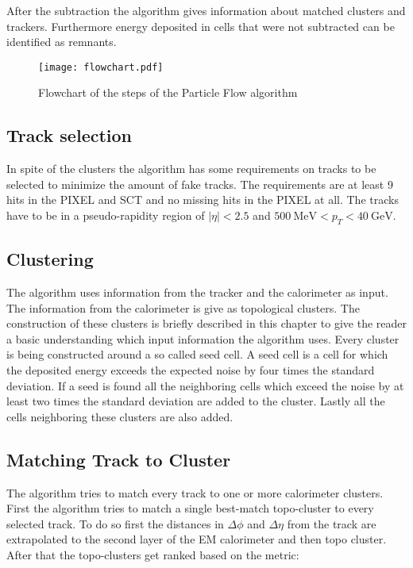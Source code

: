 After the subtraction the algorithm gives information about matched clusters and trackers. Furthermore energy deposited in cells that were not subtracted can be identified as remnants. 

\begin{figure}[h]
  \centering
  \texttt{[image: flowchart.pdf]}
  \caption[Flowchart of the steps of the Particle Flow algorithm]{Flowchart of the steps of the Particle Flow algorithm \cite{pflow16}}
  \label{fig:pflowflowchart}
\end{figure}

\subsection{Track selection}

In spite of the clusters the algorithm has some requirements on tracks to be selected to minimize the amount of fake tracks. The requirements are at least 9 hits in the PIXEL and SCT and no missing hits in the PIXEL at all. The tracks have to be in a pseudo-rapidity region of $|\eta|<2.5$ and $\SI{500}{\MeV}<p_T<\SI{40}{\GeV}$.




\subsection{Clustering}

The algorithm uses information from the tracker and the calorimeter as input. The information from the calorimeter is give as topological clusters. The construction of these clusters is briefly described in this chapter to give the reader a basic understanding which input information the algorithm uses.
Every cluster is being constructed around a so called seed cell. A seed cell is a cell for which the deposited energy exceeds the expected noise by four times the standard deviation. If a seed is found all the neighboring cells which exceed the noise by at least two times the standard deviation are added to the cluster. Lastly all the cells neighboring these clusters are also added.


\subsection{Matching Track to Cluster}

The algorithm tries to match every track to one or more calorimeter clusters. First the algorithm tries to match a single best-match topo-cluster to every selected track.
To do so first the distances in $\Delta \phi$ and $\Delta \eta$ from the track are extrapolated to the second layer of the EM calorimeter and then topo cluster. After that the topo-clusters get ranked based on the metric:


